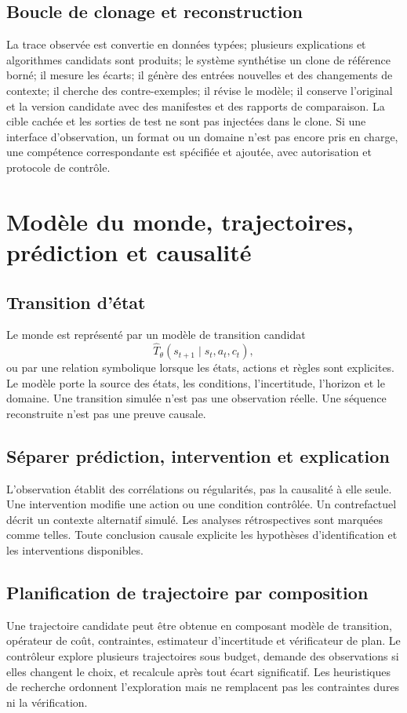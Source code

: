 \documentclass[11pt,a4paper]{article}
\begin{document}
\subsection{Boucle de clonage et reconstruction}
La trace observée est convertie en données typées; plusieurs explications et algorithmes candidats sont produits; le système synthétise un clone de référence borné; il mesure les écarts; il génère des entrées nouvelles et des changements de contexte; il cherche des contre-exemples; il révise le modèle; il conserve l'original et la version candidate avec des manifestes et des rapports de comparaison. La cible cachée et les sorties de test ne sont pas injectées dans le clone. Si une interface d'observation, un format ou un domaine n'est pas encore pris en charge, une compétence correspondante est spécifiée et ajoutée, avec autorisation et protocole de contrôle.

\section{Modèle du monde, trajectoires, prédiction et causalité}
\subsection{Transition d'état}
Le monde est représenté par un modèle de transition candidat
\[
\hat{T}_{\theta}(s_{t+1}\mid s_t,a_t,c_t),
\]
ou par une relation symbolique lorsque les états, actions et règles sont explicites. Le modèle porte la source des états, les conditions, l'incertitude, l'horizon et le domaine. Une transition simulée n'est pas une observation réelle. Une séquence reconstruite n'est pas une preuve causale.

\subsection{Séparer prédiction, intervention et explication}
L’observation établit des corrélations ou régularités, pas la causalité à elle seule. Une intervention modifie une action ou une condition contrôlée. Un contrefactuel décrit un contexte alternatif simulé. Les analyses rétrospectives sont marquées comme telles. Toute conclusion causale explicite les hypothèses d’identification et les interventions disponibles.

\subsection{Planification de trajectoire par composition}
Une trajectoire candidate peut être obtenue en composant modèle de transition, opérateur de coût, contraintes, estimateur d'incertitude et vérificateur de plan. Le contrôleur explore plusieurs trajectoires sous budget, demande des observations si elles changent le choix, et recalcule après tout écart significatif. Les heuristiques de recherche ordonnent l'exploration mais ne remplacent pas les contraintes dures ni la vérification.
\end{document}
